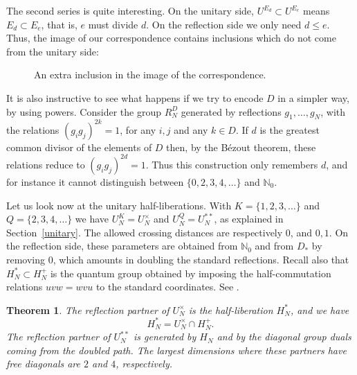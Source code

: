 \documentclass[11pt,a4paper]{article}
\newtheorem{thm}{Theorem}[section]
\begin{document}
The second series is quite interesting. On the unitary side, $U^{E_d}\subset U^{E_e}$ means $E_d\subset E_e$, that is, $e$ must divide $d$. On the reflection side we only need $d\leq e$. Thus, the image of our correspondence contains inclusions which do not come from the unitary side:

\begin{figure}[H]
\centering
{}
\caption{An extra inclusion in the image of the correspondence.}
\label{extra-order-picture}
\end{figure}

It is also instructive to see what happens if we try to encode $D$ in a simpler way, by using powers. Consider the group $R_N^D$ generated by reflections $g_1,\ldots,g_N$, with the relations $(g_ig_j)^{2k}=1$, for any $i,j$ and any $k\in D$. If $d$ is the greatest common divisor of the elements of $D$ then, by the B\'ezout theorem, these relations reduce to $(g_ig_j)^{2d}=1$. Thus this construction only remembers $d$, and for instance it cannot distinguish between $\{0,2,3,4,\ldots\}$ and $\mathbb N_0$.

Let us look now at the unitary half-liberations. With $K=\{1,2,3,\ldots\}$ and $Q=\{2,3,4,\ldots\}$ we have $U_N^K=U_N^\times$ and $U_N^Q=U_N^{**}$, as explained in Section~\ref{unitary}. The allowed crossing distances are respectively $0$, and $0,1$. On the reflection side, these parameters are obtained from $\mathbb N_0$ and from $D_*$ by removing $0$, which amounts in doubling the standard reflections. Recall also that $H_N^*\subset H_N^+$ is the quantum group obtained by imposing the half-commutation relations $uvw=wvu$ to the standard coordinates. See \cite{bcs}.

\begin{thm}\label{half-pairs}
The reflection partner of $U_N^\times$ is the half-liberation $H_N^*$, and we have
\[
 H_N^*=U_N^\times\cap H_N^+.
\]
The reflection partner of $U_N^{**}$ is generated by $H_N$ and by the diagonal group duals coming from the doubled path. The largest dimensions where these partners have free diagonals are $2$ and $4$, respectively.
\end{thm}
\end{document}
